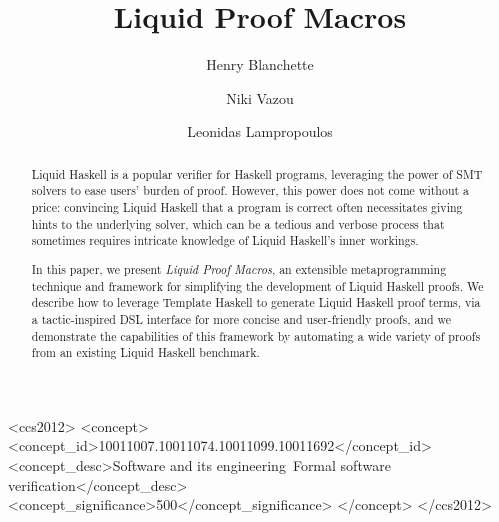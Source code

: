 \documentclass[sigplan,screen]{acmart}
\begin{document}
\title{Liquid Proof Macros}

\author{Henry Blanchette}

\author{Niki Vazou}

\author{Leonidas Lampropoulos}


\begin{abstract}
Liquid Haskell is a popular verifier for Haskell programs,
leveraging the power of SMT solvers to ease users' burden of proof.
%
However, this power does not come without a price:
convincing Liquid Haskell that a program is correct
often necessitates giving hints to the underlying solver, which can be
a tedious and verbose process that sometimes requires intricate
knowledge of Liquid Haskell's inner workings.

In this paper, we present {\em Liquid Proof Macros}, an extensible
metaprogramming technique and framework for simplifying the
development of Liquid Haskell proofs.
%
We describe how to leverage Template Haskell to generate Liquid
Haskell proof terms, via a tactic-inspired DSL interface for more
concise and user-friendly proofs,
%
and we demonstrate the capabilities of this framework by automating
a wide variety of proofs from an existing Liquid Haskell benchmark.
\end{abstract}

\begin{CCSXML}
<ccs2012>
   <concept>
       <concept_id>10011007.10011074.10011099.10011692</concept_id>
       <concept_desc>Software and its engineering~Formal software verification</concept_desc>
       <concept_significance>500</concept_significance>
       </concept>
 </ccs2012>
\end{CCSXML}
\end{document}
